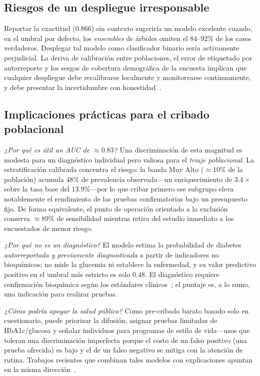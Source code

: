 \documentclass[conference]{IEEEtran}
\begin{document}
\subsection{Riesgos de un despliegue irresponsable}
Reportar la exactitud ($0.866$) sin contexto sugeriría un modelo excelente cuando, en el
umbral por defecto, los \emph{ensembles} de árboles omiten el $84$--$92\%$ de los casos
verdaderos. Desplegar tal modelo como clasificador binario sería activamente perjudicial. La
deriva de calibración entre poblaciones, el error de etiquetado por autorreporte y los sesgos
de cobertura demográfica de la encuesta implican que cualquier despliegue debe recalibrarse
localmente y monitorearse continuamente, y debe presentar la incertidumbre con
honestidad~\cite{rudin2019stop,ghassemi2021false}.

\subsection{Implicaciones prácticas para el cribado poblacional}
\emph{¿Por qué es útil un AUC de $\approx0.83$?} Una discriminación de esta magnitud es
modesta para un diagnóstico individual pero valiosa para el \emph{triaje poblacional}. La
estratificación calibrada concentra el riesgo: la banda Muy Alto ($\approx10\%$ de la
población) acumula $48\%$ de prevalencia observada---un enriquecimiento de $3.4\times$ sobre
la tasa base del $13.9\%$---por lo que cribar primero ese subgrupo eleva notablemente el
rendimiento de las pruebas confirmatorias bajo un presupuesto fijo. De forma equivalente, el
punto de operación orientado a la exclusión conserva $\approx89\%$ de sensibilidad mientras
retira del estudio inmediato a los encuestados de menor riesgo.

\emph{¿Por qué no es un diagnóstico?} El modelo estima la probabilidad de diabetes
\emph{autorreportada y previamente diagnosticada} a partir de indicadores no bioquímicos; no
mide la glucemia ni establece la enfermedad, y su valor predictivo positivo en el umbral más
estricto es solo $0.48$. El diagnóstico requiere confirmación bioquímica según los estándares
clínicos~\cite{elsayed2023classification}; el puntaje es, a lo sumo, una indicación para
realizar pruebas.

\emph{¿Cómo podría apoyar la salud pública?} Como pre-cribado barato basado solo en
cuestionario, puede priorizar la difusión, asignar pruebas limitadas de HbA1c/glucosa y
señalar individuos para programas de estilo de vida---usos que toleran una discriminación
imperfecta porque el costo de un falso positivo (una prueba ofrecida) es bajo y el de un
falso negativo se mitiga con la atención de rutina. Trabajos recientes que combinan tales
modelos con explicaciones apuntan en la misma dirección~\cite{tasin2023diabetes}.
\end{document}
